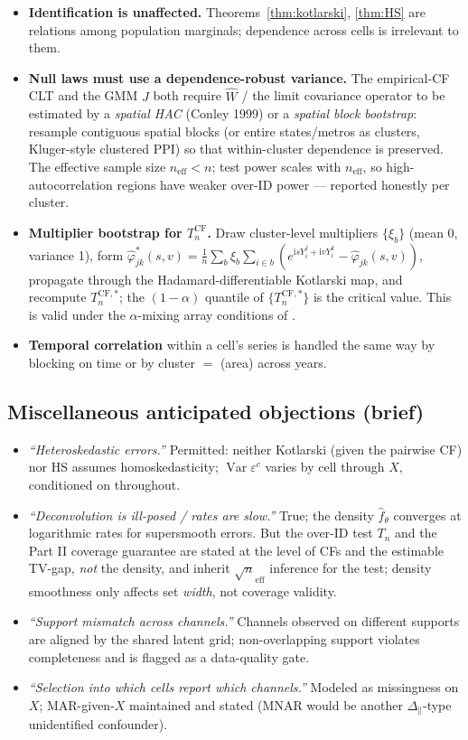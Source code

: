 \documentclass[11pt]{article}
\theoremstyle{definition}
\newcommand{\Var}{\operatorname{Var}}
\newcommand{\ecf}{\widehat{\varphi}}
\newcommand{\ii}{\mathrm{i}}          %
\newcommand{\Th}{\theta}
\newcommand{\lat}{\Th}
\newcommand{\Dpar}{\Delta_{\parallel}}
\begin{document}
\begin{itemize}[leftmargin=1.4em]
\item \textbf{Identification is unaffected.} Theorems~\ref{thm:kotlarski},
\ref{thm:HS} are relations among population marginals; dependence across cells
is irrelevant to them.
\item \textbf{Null laws must use a dependence-robust variance.} The empirical-CF
CLT and the GMM $J$ both require $\widehat W$ / the limit covariance operator to
be estimated by a \emph{spatial HAC} (Conley 1999) or a \emph{spatial block
bootstrap}: resample contiguous spatial blocks (or entire states/metros as
clusters, Kluger-style clustered PPI) so that within-cluster dependence is
preserved. The effective sample size $n_{\mathrm{eff}}<n$; test power scales
with $n_{\mathrm{eff}}$, so high-autocorrelation regions have weaker over-ID
power --- reported honestly per cluster.
\item \textbf{Multiplier bootstrap for $T_n^{\mathrm{CF}}$.} Draw cluster-level
multipliers $\{\xi_b\}$ (mean 0, variance 1), form
$\ecf^{*}_{jk}(s,v)=\frac1n\sum_b\xi_b\sum_{i\in b}
(e^{\ii sY^j_i+\ii vY^k_i}-\ecf_{jk}(s,v))$, propagate through the
Hadamard-differentiable Kotlarski map, and recompute $T_n^{\mathrm{CF},*}$; the
$(1-\alpha)$ quantile of $\{T_n^{\mathrm{CF},*}\}$ is the critical value. This
is valid under the $\alpha$-mixing array conditions of .
\item \textbf{Temporal correlation} within a cell's series is handled the same
way by blocking on time or by cluster $=$ (area) across years.
\end{itemize}

\subsection{Miscellaneous anticipated objections (brief)}
\begin{itemize}[leftmargin=1.4em]
\item \emph{``Heteroskedastic errors.''} Permitted: neither Kotlarski (given the
pairwise CF) nor HS assumes homoskedasticity; $\Var\varepsilon^c$ varies by
cell through $X$, conditioned on throughout.
\item \emph{``Deconvolution is ill-posed / rates are slow.''} True; the density
$\widehat f_\lat$ converges at logarithmic rates for supersmooth errors. But the
over-ID test $T_n$ and the Part II coverage guarantee are stated at the level of
CFs and the estimable TV-gap, \emph{not} the density, and inherit
$\sqrt n_{\mathrm{eff}}$ inference for the test; density smoothness only affects
set \emph{width}, not coverage validity.
\item \emph{``Support mismatch across channels.''} Channels observed on
different supports are aligned by the shared latent grid; non-overlapping
support violates  completeness and is flagged as a data-quality gate.
\item \emph{``Selection into which cells report which channels.''} Modeled as
missingness on $X$; MAR-given-$X$ maintained and stated (MNAR would be another
$\Dpar$-type unidentified confounder).
\end{itemize}
\end{document}
